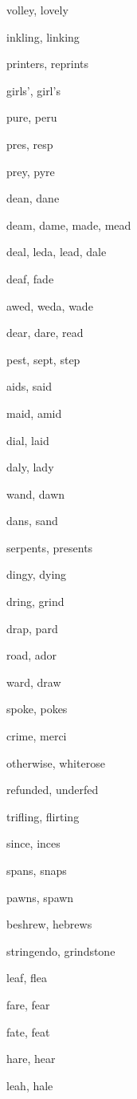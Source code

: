     \item volley, lovely
    \item inkling, linking
    \item printers, reprints
    \item girls', girl's
    \item pure, peru
    \item pres, resp
    \item prey, pyre
    \item dean, dane
    \item deam, dame, made, mead
    \item deal, leda, lead, dale
    \item deaf, fade
    \item awed, weda, wade
    \item dear, dare, read
    \item pest, sept, step
    \item aids, said
    \item maid, amid
    \item dial, laid
    \item daly, lady
    \item wand, dawn
    \item dans, sand
    \item serpents, presents
    \item dingy, dying
    \item dring, grind
    \item drap, pard
    \item road, ador
    \item ward, draw
    \item spoke, pokes
    \item crime, merci
    \item otherwise, whiterose
    \item refunded, underfed
    \item trifling, flirting
    \item since, inces
    \item spans, snaps
    \item pawns, spawn
    \item beshrew, hebrews
    \item stringendo, grindstone
    \item leaf, flea
    \item fare, fear
    \item fate, feat
    \item hare, hear
    \item leah, hale
